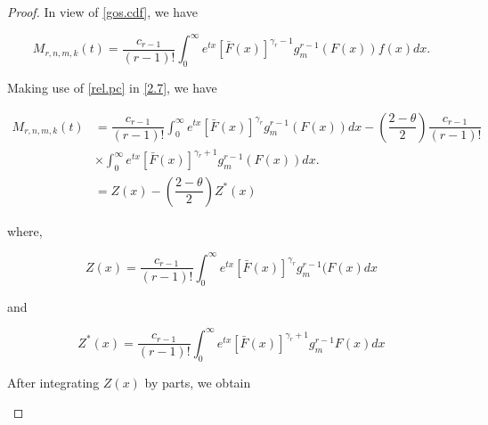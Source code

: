 \documentclass[11pt,a4paper]{article}
\numberwithin{equation}{section}
\begin{document}
	\begin{proof}

		In view of \eqref{gos.cdf}, we have 

		\begin{equation}\label{2.7}

			M_{r,n,m,k}(t)=\dfrac{c_{r-1}}{(r-1)!}\int_{0}^\infty{e^{tx}}\left[\bar{F}\left(x\right)\right]^{\gamma _{r} -1}g_{m}^{r-1}\left(F(x)\right) f\left(x\right)dx.

		\end{equation}

		Making use of \eqref{rel.pc} in \eqref{2.7}, we have

		\begin{align}\label{2.8}

			M_{r,n,m,k}(t)&=\dfrac{c_{r-1}}{(r-1)!}\int_{0}^\infty{e^{tx}}\left[\bar{F}\left(x\right)\right]^{\gamma _{r}}g_{m}^{r-1}\left(F(x)\right)dx

			-{\left(\dfrac{2-\theta}{2}\right)}\dfrac{c_{r-1}}{(r-1)!}\nonumber\\

			&\times\int_{0}^\infty{e^{tx}}\left[\bar{F}\left(x\right)\right]^{\gamma _{r} +1}g_{m}^{r-1}\left(F(x)\right)dx.\nonumber \\

			&=Z(x)-{\left(\dfrac{2-\theta}{2}\right)}Z^{*}(x)

		\end{align}

		where,

		\begin{equation}

			Z(x)=\dfrac{c_{r-1}}{(r-1)!}\int_{0}^\infty{e^{tx}}\left[\bar{F}\left(x\right)\right]^{\gamma _{r}}g_{m}^{r-1}(F(x)dx\nonumber

		\end{equation}

		and 

		\begin{equation}

			Z^{*}(x)=\dfrac{c_{r-1}}{(r-1)! }\int_{0}^\infty{e^{tx}}\left[\bar{F}\left(x\right)\right]^{\gamma _{r}+1}g_{m}^{r-1}F(x)dx\nonumber

		\end{equation}

		After integrating $Z(x)$ by parts, we obtain

		

		\begin{equation}


\end{equation}
\end{proof}
\end{document}
